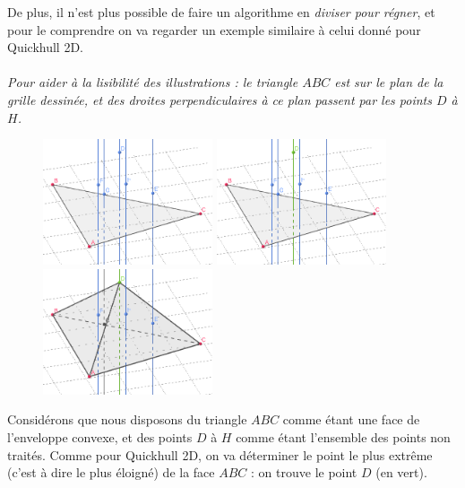 \documentclass[]{article}
\begin{document}
De plus, il n'est plus possible de faire un algorithme en \emph{diviser pour régner}, et pour le comprendre on va regarder un exemple similaire à celui donné pour Quickhull 2D.

\paragraph{}
\emph{Pour aider à la lisibilité des illustrations : le triangle $ABC$ est sur le plan de la grille dessinée, et des droites perpendiculaires à ce plan passent par les points $D$ à $H$.}

\begin{figure}[H]
	\begin{center}
		\includegraphics[width=5cm]{qh3d/geogebra-export3.png}
		\includegraphics[width=5cm]{qh3d/geogebra-export4.png}
		\includegraphics[width=5cm]{qh3d/geogebra-export5.png}
	\end{center}
\end{figure}

Considérons que nous disposons du triangle $ABC$ comme étant une face de l'enveloppe convexe, et des points $D$ à $H$ comme étant l'ensemble des points non traités. Comme pour Quickhull 2D, on va déterminer le point le plus extrême (c'est à dire le plus éloigné) de la face $ABC$ : on trouve le point $D$ (en vert).
\end{document}
